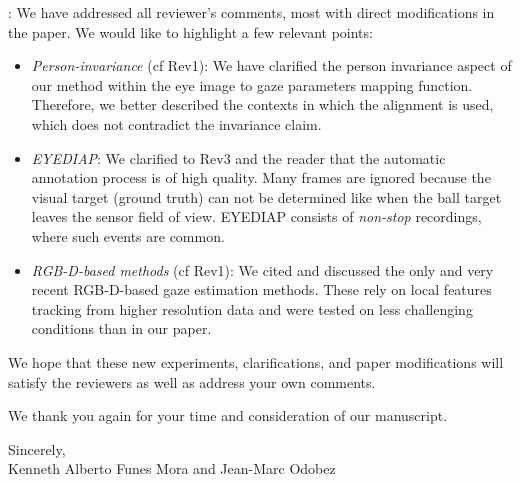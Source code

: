 \documentclass[12pt]{article}
\begin{document}
: We have addressed all reviewer's comments, most with direct modifications in the paper. We would like to
highlight a few relevant points:
\begin{itemize}
 \item {\em Person-invariance} (cf Rev1): We have clarified the person invariance aspect of our method within the eye image
 to gaze parameters mapping function. Therefore, we better described the contexts  in which the alignment is used,
 which does not contradict the invariance claim.
%
 \item {\em EYEDIAP}: We clarified to Rev3 and the reader that the automatic annotation process is of high quality. Many frames are ignored because
 the visual target (ground truth) can not be determined like when the ball target leaves the sensor  field of view. EYEDIAP consists
 of {\em non-stop} recordings, where such events are common.
%
 \item {\em RGB-D-based methods} (cf Rev1): We cited and discussed the only and very recent RGB-D-based gaze estimation methods.
 These rely on local features tracking from higher resolution data and were tested on less challenging conditions than in our paper.
\end{itemize}

We hope that these new experiments, clarifications, and paper modifications will satisfy the reviewers as well as address your own comments. 

\vspace*{2mm}
We thank you again for your time and consideration of our manuscript.




\vspace*{8mm}

\noindent Sincerely,\\[3mm]
%
Kenneth Alberto Funes Mora and Jean-Marc Odobez



\newpage
\end{document}

